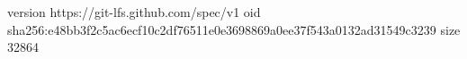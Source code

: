 version https://git-lfs.github.com/spec/v1
oid sha256:e48bb3f2c5ac6ecf10c2df76511e0e3698869a0ee37f543a0132ad31549c3239
size 32864
